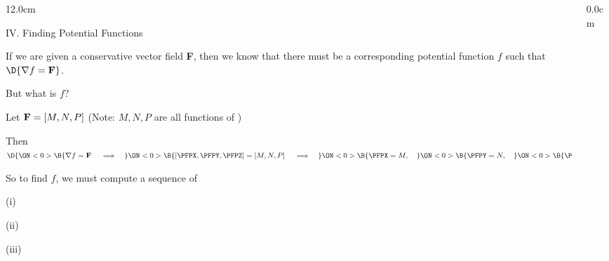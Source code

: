 \begin{frame}
\begin{columns}\begin{column}{12.0cm}

{IV. Finding Potential Functions}

\vspace{0.3cm}

\scriptsize
If we are given a conservative vector field {\bf F}, then we know that there must be a corresponding potential function $f$ such that $\D{{\nabla f = {\bf F}}}$.

\vspace{0.4cm}

But what is $f$?

\vspace{0.5cm}

Let ${\bf F} = [M,N,P]$ \qquad (Note: $M, N, P$ are all functions of 
)

\vspace{0.5cm}

Then
$\D{ 
\ON<0>{\B{\nabla f = {\bf F} \quad \implies \quad}}
\ON<0>{\B{\left[\PFPX,\PFPY,\PFPZ\right] = [M,N,P] \quad \implies \quad}}
\ON<0>{\B{\PFPX = M, \quad}}
\ON<0>{\B{\PFPY = N, \quad}}
\ON<0>{\B{\PFPZ = P}}
}$ 

\vspace{0.5cm}

So to find $f$, we must compute a sequence of 

\vspace{0.5cm}

(i) 

\vspace{0.3cm}

(ii) 

\vspace{0.3cm}

(iii)

\vspace{1.2cm}

\end{column}\begin{column}{0.0cm}\end{column}\end{columns}
\end{frame}

